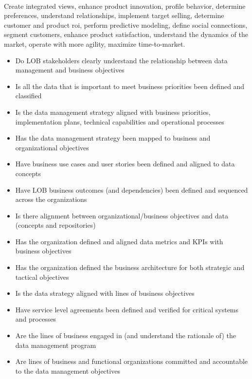 ~\\

\begin{description}[nosep,font=\bfseries]

  \item [High-Level Business Goals]
  Create integrated views, enhance product innovation, profile behavior, 
  determine preferences, understand relationships, implement target selling, 
  determine customer and product \gls{roi}, perform predictive modeling,
  define social connections, segment customers, enhance product satisfaction, 
  understand the dynamics of the market, operate with more agility, 
  maximize time-to-market.
  ~\\
  \begin{itemize}
    \item Do LOB stakeholders clearly understand the relationship between data management and business objectives
    \item Is all the data that is important to meet business priorities been defined and classified
    \item Is the data management strategy aligned with business priorities, implementation plans, technical capabilities and operational processes
    \item Has the data management strategy been mapped to business and organizational objectives
    \item Have business use cases and user stories been defined and aligned to data concepts
    \item Have LOB business outcomes (and dependencies) been defined and sequenced across the organizations
    \item Is there alignment between organizational/business objectives and data (concepts and repositories)
    \item Has the organization defined and aligned data metrics and KPIs with business objectives
    \item Has the organization defined the business architecture for both strategic and tactical objectives
    \item Is the data strategy aligned with lines of business objectives
    \item Have service level agreements been defined and verified for critical systems and processes
    \item Are the lines of business engaged in (and understand the rationale of) the data management program
    \item Are lines of business and functional organizations committed and accountable to the data management objectives
  \end{itemize}


\end{description}
